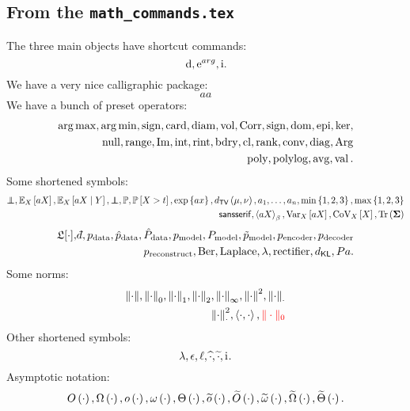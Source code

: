 \subsection{From the \texttt{math\_commands.tex}}
The three main objects have shortcut commands:
\begin{equation}
   \,\mathrm{d}, \mathrm{e}^{arg}, \mathrm{i}.  
\end{equation}
We have a very nice calligraphic package:
\begin{equation}
    aa
\end{equation}
We have a bunch of preset operators:
\begin{align}
    \operatorname*{arg\,max}, \operatorname*{arg\,min}, \operatorname{sign}, \operatorname{card}, \operatorname{diam}, \operatorname{vol}, \operatorname{Corr}, \operatorname{sign}, \operatorname{dom}, \operatorname{epi}, \operatorname{ker},
    \\
    \operatorname{null}, \operatorname{range}, \operatorname{Im}, \operatorname{int}, \operatorname{rint}, \operatorname{bdry}, \operatorname{cl}, \operatorname{rank}, \operatorname{conv}, \operatorname{diag}, \operatorname{Arg}
    \\
    \operatorname{\mathrm{poly}}, \operatorname{\mathrm{polylog}}, \operatorname{\mathop{\mathrm{avg}}}, \operatorname{{\mathrm{val}}}. 
\end{align}
Some shortened symbols:
 \begin{align}
     \independent, \Exp{X}{aX},\ExpCond{X}{aX}{Y}, \indep, \Prob, \Proba{X> t}, \expon{ax}, \dTV{\mu}{\nu}, \abc{a}{n}, \minim{1, 2, 3}, \maxim{1, 2, 3}
     \\
     \msf{sans serif}, \boltz{aX}{\beta}, \Var{X}{aX}, \CoV{X}{X}, \Tr{\mSigma}
 \end{align}
 \begin{align}
  \LFtr{\cdot}, \dbar, \pdata, \ptrain, \Ptrain, \pmodel, \Pmodel, \ptildemodel, \pencode, \pdecode
  \\
  \precons, \bernoulli, \laplace, \reg, \rect, \KL, \parents. %
 \end{align}
 Some norms:
 \begin{align}
    {\left\| \cdot \right\|}, {\left\| \cdot \right\|_0}, {\left\| \cdot \right\|_1}, {\left\| \cdot \right\|_2}, {\left\| \cdot \right\|_{\infty}}, {\left\| \cdot \right\|^2}, {\left\| \cdot \right\|_{\cdot}}
\\
{\left\| \cdot \right\|^2_{\cdot}}, \left\langle\cdot,\cdot\right\rangle, {\color{red}\|\cdot\|_0}
\end{align}
 Other shortened symbols:
 \begin{equation}
    {\lambda}, {\epsilon}, \ell, \widehat{\cdot}, \widetilde{\cdot}, \mathrm{i}\mkern1mu. 
 \end{equation}
 Asymptotic notation:
 \begin{equation}
    O\left(\cdot\right), \Omega\left(\cdot\right), o\left(\cdot\right), \omega\left(\cdot\right), \Theta\left(\cdot\right), \widetilde{o}\left(\cdot\right), \widetilde{O}\left(\cdot\right), \widetilde{\omega}\left(\cdot\right), \widetilde{\Omega}\left(\cdot\right), \widetilde{\Theta}\left(\cdot\right). 
 \end{equation}
